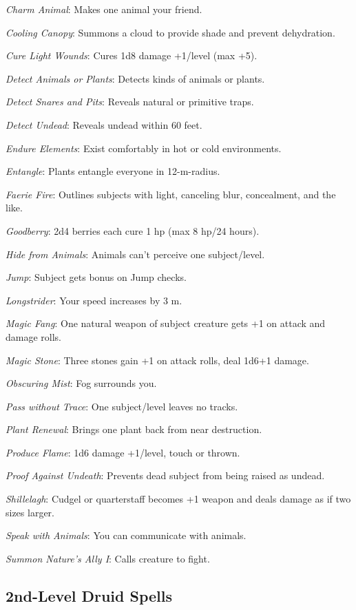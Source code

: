 \textit{Charm Animal}: Makes one animal your friend.

\textit{Cooling Canopy}: Summons a cloud to provide shade and prevent dehydration.

\textit{Cure Light Wounds}: Cures 1d8 damage +1/level (max +5).

\textit{Detect Animals or Plants}: Detects kinds of animals or plants.

\textit{Detect Snares and Pits}: Reveals natural or primitive traps.

\textit{Detect Undead}: Reveals undead within 60 feet.

\textit{Endure Elements}: Exist comfortably in hot or cold environments.

\textit{Entangle}: Plants entangle everyone in 12-m-radius.

\textit{Faerie Fire}: Outlines subjects with light, canceling blur, concealment, and the like.

\textit{Goodberry}: 2d4 berries each cure 1 hp (max 8 hp/24 hours).

\textit{Hide from Animals}: Animals can't perceive one subject/level.

\textit{Jump}: Subject gets bonus on Jump checks.

\textit{Longstrider}: Your speed increases by 3 m.

\textit{Magic Fang}: One natural weapon of subject creature gets +1 on attack and damage rolls.

\textit{Magic Stone}: Three stones gain +1 on attack rolls, deal 1d6+1 damage.

\textit{Obscuring Mist}: Fog surrounds you.

\textit{Pass without Trace}: One subject/level leaves no tracks.

\textit{Plant Renewal}: Brings one plant back from near destruction.

\textit{Produce Flame}: 1d6 damage +1/level, touch or thrown.

\textit{Proof Against Undeath}: Prevents dead subject from being raised as undead.

\textit{Shillelagh}: Cudgel or quarterstaff becomes +1 weapon and deals damage as if two sizes larger.

\textit{Speak with Animals}: You can communicate with animals.

\textit{Summon Nature's Ally I}: Calls creature to fight.



\subsection{2nd-Level Druid Spells}

